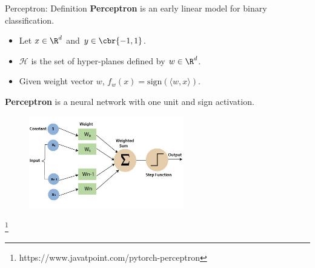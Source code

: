 \documentclass[notheorems]{beamer}
\newcommand{\source}[1]{{\let\thefootnote\relax\footnote{{\tiny #1}}}}
\begin{document}
    \begin{frame}{Perceptron: Definition}
        \textbf{Perceptron} is an early linear model for binary classification.
        \begin{itemize}
            \item Let $x \in \R^d$ and $y \in \cbr{-1,1}$.
            \item $\mathcal{H}$ is the set of hyper-planes defined by $w \in \R^d$.
            \item Given weight vector $w$, $f_w(x) = \text{sign}(\langle w, x \rangle)$.
        \end{itemize}
        \textbf{Perceptron} is a neural network with one unit and sign activation.
        \begin{figure}
            \includegraphics[width=0.6\textwidth]{figures/perceptron}
        \end{figure}

        \source{https://www.javatpoint.com/pytorch-perceptron}

    \end{frame}
\end{document}
